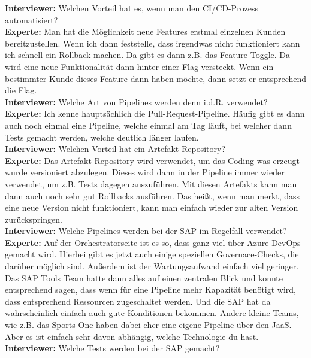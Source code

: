 \begin{linenumbers}
    \textbf{Interviewer:} Welchen Vorteil hat es, wenn man den CI/CD-Prozess automatisiert?\\
    \textbf{Experte:} Man hat die Möglichkeit neue Features erstmal einzelnen Kunden bereitzustellen. Wenn ich dann feststelle, dass irgendwas nicht funktioniert kann ich schnell ein Rollback machen. Da gibt es dann z.B. das Feature-Toggle. Da wird eine neue Funktionalität dann hinter einer Flag versteckt. Wenn ein bestimmter Kunde dieses Feature dann haben möchte, dann setzt er entsprechend die Flag.\\
    \textbf{Interviewer:} Welche Art von Pipelines werden denn i.d.R. verwendet?\\
    \textbf{Experte:} Ich kenne hauptsächlich die Pull-Request-Pipeline. Häufig gibt es dann auch noch einmal eine Pipeline, welche einmal am Tag läuft, bei welcher dann Tests gemacht werden, welche deutlich länger laufen.\\
    \textbf{Interviewer:} Welchen Vorteil hat ein Artefakt-Repository?\\
    \textbf{Experte:} Das Artefakt-Repository wird verwendet, um das Coding was erzeugt wurde versioniert abzulegen. Dieses wird dann in der Pipeline immer wieder verwendet, um z.B. Tests dagegen auszuführen. Mit diesen Artefakts kann man dann auch noch sehr gut Rollbacks ausführen. Das heißt, wenn man merkt, dass eine neue Version nicht funktioniert, kann man einfach wieder zur alten Version zurückspringen.\\
    \textbf{Interviewer:} Welche Pipelines werden bei der SAP im Regelfall verwendet?\\
    \textbf{Experte:} Auf der Orchestratorseite ist es so, dass ganz viel über Azure-DevOps gemacht wird. Hierbei gibt es jetzt auch einige speziellen Governace-Checks, die darüber möglich sind. Außerdem ist der Wartungsaufwand einfach viel geringer. Das SAP Tools Team hatte dann alles auf einen zentralen Blick und konnte entsprechend sagen, dass wenn für eine Pipeline mehr Kapazität benötigt wird, dass entsprechend Ressourcen zugeschaltet werden. Und die SAP hat da wahrscheinlich einfach auch gute Konditionen bekommen. Andere kleine Teams, wie z.B. das Sports One haben dabei eher eine eigene Pipeline über den JaaS. Aber es ist einfach sehr davon abhängig, welche Technologie du hast.\\
    \textbf{Interviewer:} Welche Tests werden bei der SAP gemacht?\\

\end{linenumbers}
